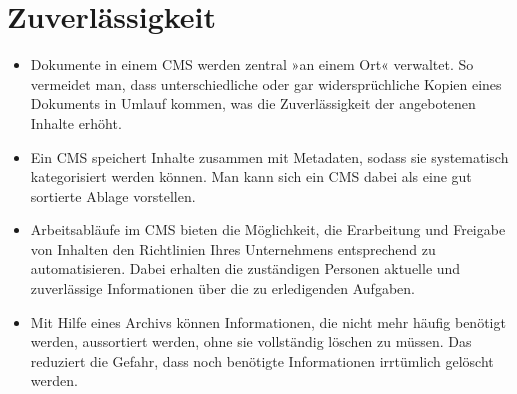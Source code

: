 \documentclass[a4paper,12pt,ngerman]{manual}
\begin{document}
\section{Zuverlässigkeit}
\begin{itemize}
\item {} 
Dokumente in einem CMS werden zentral »an einem Ort« verwaltet. So
vermeidet man, dass unterschiedliche oder gar widersprüchliche Kopien eines
Dokuments in Umlauf kommen, was die Zuverlässigkeit der angebotenen Inhalte
erhöht.

\item {} 
Ein CMS speichert Inhalte zusammen mit Metadaten, sodass sie
systematisch kategorisiert werden können. Man kann sich ein CMS dabei als
eine gut sortierte Ablage vorstellen.

\item {} 
Arbeitsabläufe im CMS bieten die Möglichkeit, die Erarbeitung
und Freigabe von Inhalten den Richtlinien Ihres Unternehmens
entsprechend zu automatisieren. Dabei erhalten die zuständigen
Personen aktuelle und zuverlässige Informationen über die zu
erledigenden Aufgaben.

\item {} 
Mit Hilfe eines Archivs können Informationen, die nicht mehr
häufig benötigt werden, aussortiert werden, ohne sie vollständig
löschen zu müssen. Das reduziert die Gefahr, dass noch benötigte
Informationen irrtümlich gelöscht werden.

\end{itemize}
\end{document}
